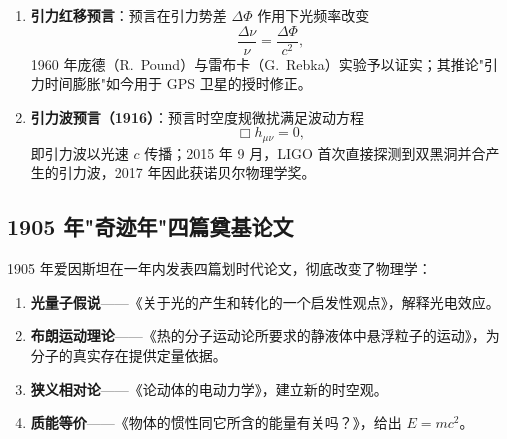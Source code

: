 \documentclass{ctexart} %
\begin{document}
\begin{enumerate}
    \item \textbf{引力红移预言}：预言在引力势差 $\Delta\Phi$ 作用下光频率改变
    \begin{equation}
        \frac{\Delta\nu}{\nu} = \frac{\Delta\Phi}{c^2},
        \label{eq:rs-main}
    \end{equation}
    1960 年庞德（R.~Pound）与雷布卡（G.~Rebka）实验予以证实\cite{pound1960}；其推论"引力时间膨胀"如今用于 GPS 卫星的授时修正。
    \item \textbf{引力波预言（1916）}：预言时空度规微扰满足波动方程
    \begin{equation}
        \Box h_{\mu\nu} = 0,
        \label{eq:gw-main}
    \end{equation}
    即引力波以光速 $c$ 传播；2015 年 9 月，LIGO 首次直接探测到双黑洞并合产生的引力波\cite{abbott2016}，2017 年因此获诺贝尔物理学奖。
\end{enumerate}

\subsection*{1905 年"奇迹年"四篇奠基论文}
1905 年爱因斯坦在一年内发表四篇划时代论文，彻底改变了物理学：
\begin{enumerate}
    \item \textbf{光量子假说}——《关于光的产生和转化的一个启发性观点》\cite{einstein1905photoelectric}，解释光电效应。
    \item \textbf{布朗运动理论}——《热的分子运动论所要求的静液体中悬浮粒子的运动》\cite{einstein1905brownian}，为分子的真实存在提供定量依据。
    \item \textbf{狭义相对论}——《论动体的电动力学》\cite{einstein1905sr}，建立新的时空观。
    \item \textbf{质能等价}——《物体的惯性同它所含的能量有关吗？》\cite{einstein1905mass}，给出 $E = mc^2$。
\end{enumerate}
\end{document}
